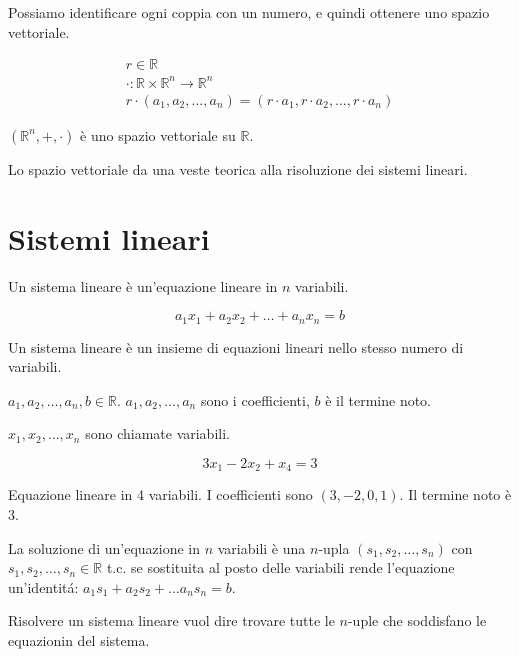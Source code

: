 Possiamo identificare ogni coppia con un numero, e quindi ottenere uno spazio vettoriale.

\begin{gather*}
r \in \mathbb{R} \\
\cdot : \mathbb{R} \times \mathbb{R}^n \to \mathbb{R}^n \\
r \cdot (a_1, a_2, \dots, a_n) = (r \cdot a_1, r \cdot a_2, \dots, r \cdot a_n)
\end{gather*}

$(\mathbb{R}^n, +, \cdot)$ \`e uno spazio vettoriale su $\mathbb{R}$.

Lo spazio vettoriale da una veste teorica alla risoluzione dei sistemi lineari.

\section{Sistemi lineari}

Un sistema lineare \`e un'equazione lineare in $n$ variabili.

\[
a_1 x_1 + a_2 x_2 + \dots + a_n x_n = b
\]

Un sistema lineare \`e un insieme di equazioni lineari nello stesso numero di variabili.

$a_1, a_2, \dots, a_n, b \in \mathbb{R}$. $a_1, a_2, \dots, a_n$ sono i coefficienti, $b$ \`e il termine noto.

$x_1, x_2, \dots, x_n$ sono chiamate variabili.

\[
3x_1 - 2x_2 + x_4 = 3
\]

Equazione lineare in 4 variabili. I coefficienti sono $(3, -2, 0, 1)$. Il termine noto \`e 3.

La soluzione di un'equazione in $n$ variabili \`e una $n$-upla $(s_1, s_2, \dots, s_n)$ con $s_1, s_2, \dots, s_n \in \mathbb{R}$ t.c. se sostituita al posto delle variabili rende l'equazione un'identit\'a: $a_1 s_1 + a_2 s_2 + \dots a_n s_n = b$.

Risolvere un sistema lineare vuol dire trovare tutte le $n$-uple che soddisfano le equazionin del sistema.
















